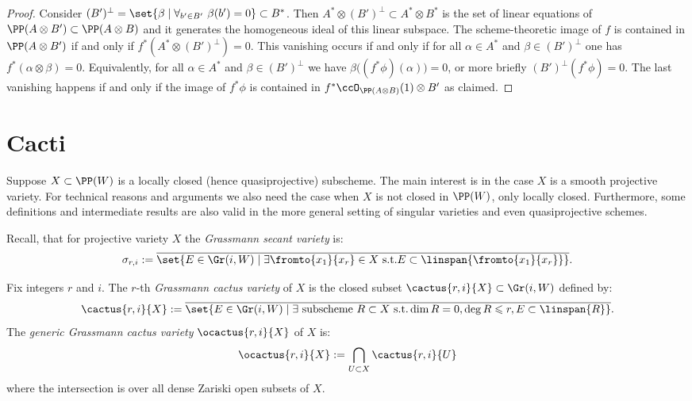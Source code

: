 \documentclass[12pt,a4paper]{article}
\begin{document}
\begin{proof}
    Consider $(B')^{\perp} = \set{\beta\mid \forall_{b'\in B'} \ \beta(b')=0} \subset B^*$.
    Then $A^*\otimes(B')^\perp \subset A^* \otimes B^*$ is the set of linear equations of $\PP(A\otimes B')\subset \PP (A\otimes B)$ and it generates the homogeneous ideal of this linear subspace.
    The scheme-theoretic image of $f$ is contained in
       $\PP(A \otimes B')$ if and only if $f^*(A^*\otimes(B')^\perp) = 0$.
    This vanishing occurs
       if and only if
       for all $\alpha\in A^*$ and $\beta\in (B')^\perp$
       one has $f^*(\alpha\otimes \beta) =0$.
     Equivalently, for all $\alpha\in A^*$ and $\beta\in (B')^\perp$
       we have $\beta\bigl((f^*\phi)(\alpha)\bigr)=0$,
       or more briefly $(B')^{\perp} (f^*\phi) =0$.
      The last vanishing happens if and only if the image of  $f^*\phi$ is contained in $f^*\ccO_{\PP (A\otimes B)}(1) \otimes B'$
       as claimed.
\end{proof}

\section{Cacti}
\label{sec_cacti}

Suppose $X\subset \PP(W)$ is a locally closed (hence quasiprojective) subscheme.
The main interest is in the case $X$ is a smooth projective variety. For technical reasons and arguments we also need the case when $X$ is not closed in $\PP(W)$, only locally closed.
Furthermore, some definitions and intermediate results are also valid in the more general setting of singular varieties and even quasiprojective schemes.

Recall, that for projective variety $X$ the \emph{Grassmann secant variety} is:
\[
  \sigma_{r,i}:=\overline{\set{E\in \Gr(i, W) \mid
    \exists \fromto{x_1}{x_r} \in X \text{ s.t.}  E \subset \linspan{\fromto{x_1}{x_r}} }}.
\]


\begin{defin}
\label{def_Grassmann_cactus_variety}
Fix integers $r$ and $i$.
The $r$-th \emph{Grassmann cactus variety} of $X$ is the closed subset $\cactus{r,i}{X} \subset \Gr(i,W)$ defined by:
\[
 \cactus{r,i}{X} := \overline{\set{E\in \Gr(i, W) \mid
    \exists \text{ subscheme } R\subset X \text{ s.t.} \dim R = 0, \deg R \leqslant r, E \subset \linspan{R} }}.
\]
The \emph{generic Grassmann cactus variety} $\ocactus{r,i}{X}$ of $X$ is:
\[
 \ocactus{r,i}{X} := \bigcap_{U\subset X} \cactus{r,i}{U}
\]
where the intersection is over all dense Zariski open subsets of $X$.
\end{defin}
\end{document}

